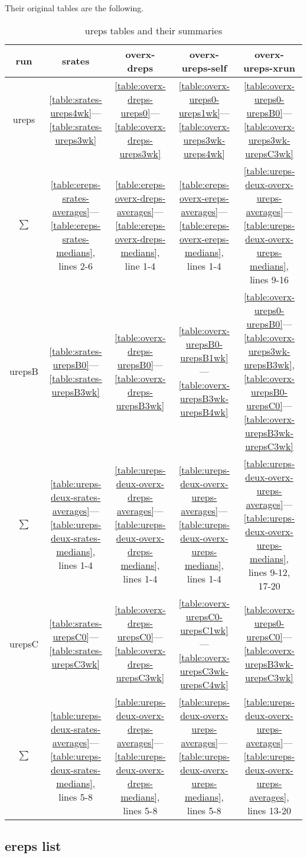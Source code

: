 \documentclass[10pt,oneside]{memoir}
\begin{document}
Their original tables are the following.



\begin{table}
\begin{tabular}{|ccccc|}
\toprule
run & srates & overx-dreps & overx-ureps-self & overx-ureps-xrun \\
\midrule
ureps & \ref{table:srates-ureps4wk}—\ref{table:srates-ureps3wk} & \ref{table:overx-dreps-ureps0}—\ref{table:overx-dreps-ureps3wk} & \ref{table:overx-ureps0-ureps1wk}—\ref{table:overx-ureps3wk-ureps4wk} & \ref{table:overx-ureps0-urepsB0}—\ref{table:overx-ureps3wk-urepsC3wk} \\
$\sum$ & \ref{table:ereps-srates-averages}—\ref{table:ereps-srates-medians}, lines 2-6 & \ref{table:ereps-overx-dreps-averages}—\ref{table:ereps-overx-dreps-medians}, line 1-4 & \ref{table:ereps-overx-ereps-averages}—\ref{table:ereps-overx-ereps-medians}, lines 1-4 & \ref{table:ureps-deux-overx-ureps-averages}—\ref{table:ureps-deux-overx-ureps-medians}, lines 9-16 \\
\hline
urepsB & \ref{table:srates-urepsB0}—\ref{table:srates-urepsB3wk} & \ref{table:overx-dreps-urepsB0}—\ref{table:overx-dreps-urepsB3wk} & \ref{table:overx-urepsB0-urepsB1wk}—\ref{table:overx-urepsB3wk-urepsB4wk} & \ref{table:overx-ureps0-urepsB0}—\ref{table:overx-ureps3wk-urepsB3wk}, \ref{table:overx-urepsB0-urepsC0}—\ref{table:overx-urepsB3wk-urepsC3wk} \\
$\sum$ & \ref{table:ureps-deux-srates-averages}—\ref{table:ureps-deux-srates-medians}, lines 1-4 & \ref{table:ureps-deux-overx-dreps-averages}—\ref{table:ureps-deux-overx-dreps-medians}, lines 1-4 & \ref{table:ureps-deux-overx-ureps-averages}—\ref{table:ureps-deux-overx-ureps-medians}, lines 1-4 & \ref{table:ureps-deux-overx-ureps-averages}—\ref{table:ureps-deux-overx-ureps-medians}, lines 9-12, 17-20 \\
\hline
urepsC & \ref{table:srates-urepsC0}—\ref{table:srates-urepsC3wk} & \ref{table:overx-dreps-urepsC0}—\ref{table:overx-dreps-urepsC3wk} & \ref{table:overx-urepsC0-urepsC1wk}—\ref{table:overx-urepsC3wk-urepsC4wk} & \ref{table:overx-ureps0-urepsC0}—\ref{table:overx-urepsB3wk-urepsC3wk} \\
$\sum$ & \ref{table:ureps-deux-srates-averages}—\ref{table:ureps-deux-srates-medians}, lines 5-8 & \ref{table:ureps-deux-overx-dreps-averages}—\ref{table:ureps-deux-overx-dreps-medians}, lines 5-8 & \ref{table:ureps-deux-overx-ureps-averages}—\ref{table:ureps-deux-overx-ureps-medians}, lines 5-8 & \ref{table:ureps-deux-overx-ureps-averages}—\ref{table:ureps-deux-overx-ureps-averages}, lines 13-20 \\
\bottomrule
\end{tabular}
\caption{ureps tables and their summaries}
\label{table:ureps-tables}
\end{table}
\pagebreak \subsection{ereps list}
\label{erepslist}
\end{document}
